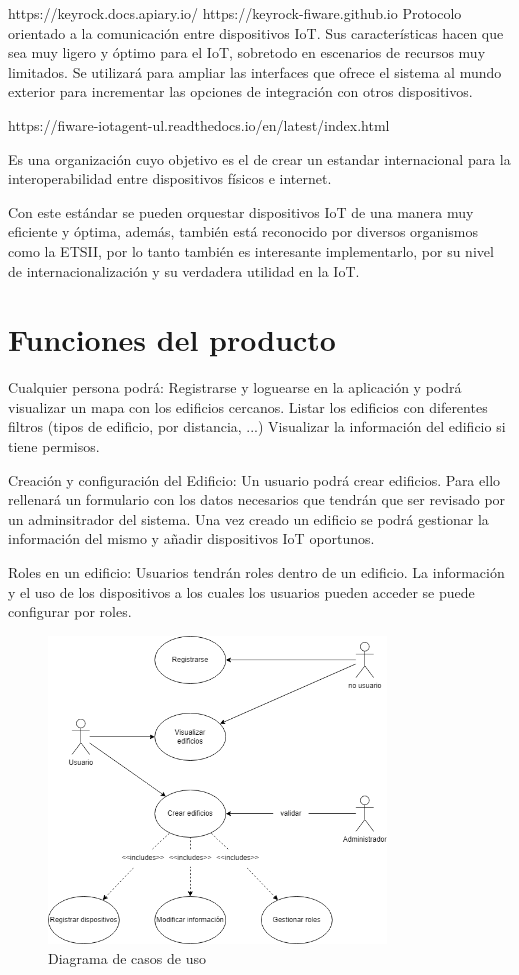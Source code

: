 \documentclass[12pt, a4paper, twoside]{article}
\begin{document}
https://keyrock.docs.apiary.io/
https://keyrock-fiware.github.io
Protocolo orientado a la comunicación entre dispositivos IoT.
Sus características hacen que sea muy ligero y óptimo para el IoT, sobretodo
en escenarios de recursos muy limitados.
Se utilizará para ampliar las interfaces que ofrece el sistema al mundo exterior
para incrementar las opciones de integración con otros dispositivos.

https://fiware-iotagent-ul.readthedocs.io/en/latest/index.html

Es una organización cuyo objetivo es el de crear un estandar internacional para la interoperabilidad
entre dispositivos físicos e internet.

Con este estándar se pueden orquestar dispositivos IoT de una manera muy eficiente y óptima, además,
también está reconocido por diversos organismos como la ETSII, por lo tanto también es interesante
implementarlo, por su nivel de internacionalización y su verdadera utilidad en la IoT.

\section{Funciones del producto}
Cualquier persona podrá:
 Registrarse y loguearse en la aplicación y podrá visualizar un mapa con los edificios cercanos.
 Listar los edificios con diferentes filtros (tipos de edificio, por distancia, ...)
 Visualizar la información del edificio si tiene permisos.

Creación y configuración del Edificio:
 Un usuario podrá crear edificios. Para ello rellenará un formulario con los datos necesarios que
 tendrán que ser revisado por un adminsitrador del sistema.
 Una vez creado un edificio se podrá gestionar la información del mismo y añadir dispositivos IoT oportunos.

Roles en un edificio:
 Usuarios tendrán roles dentro de un edificio. La información y el uso de los dispositivos a los cuales
 los usuarios pueden acceder se puede configurar por roles.

\begin{figure}[h]
  \centering
  \includegraphics[width=0.8\textwidth]{UserCase.0.1.png}
  \caption{Diagrama de casos de uso}
\end{figure}
\end{document}
